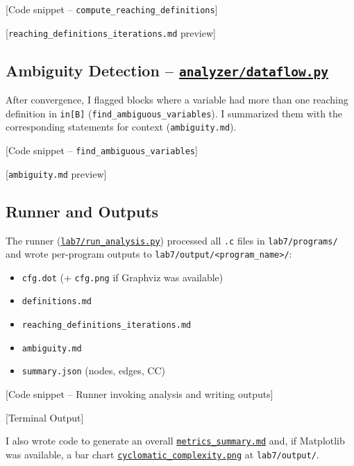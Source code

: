 \documentclass[10pt,a4paper]{report}
\begin{document}
[Code snippet -- \texttt{compute\_reaching\_definitions}]

[\texttt{reaching\_definitions\_iterations.md} preview]

\subsection{Ambiguity Detection -- \href{https://github.com/ShardulJunagade/cs202-stt/tree/main/lab7/analyzer/dataflow.py}{\texttt{analyzer/dataflow.py}}}
After convergence, I flagged blocks where a variable had more than one reaching definition in \texttt{in[B]} (\texttt{find\_ambiguous\_variables}). I summarized them with the corresponding statements for context (\texttt{ambiguity.md}).

[Code snippet -- \texttt{find\_ambiguous\_variables}]

[\texttt{ambiguity.md} preview]

\subsection{Runner and Outputs}
The runner (\href{https://github.com/ShardulJunagade/cs202-stt/tree/main/lab7/run_analysis.py}{\texttt{lab7/run\_analysis.py}}) processed all \texttt{.c} files in \texttt{lab7/programs/} and wrote per-program outputs to \texttt{lab7/output/\textless program\_name\textgreater{}/}:
\begin{itemize}[itemsep=0em, topsep=0pt]
    \item \texttt{cfg.dot} (+ \texttt{cfg.png} if Graphviz was available)
    \item \texttt{definitions.md}
    \item \texttt{reaching\_definitions\_iterations.md}
    \item \texttt{ambiguity.md}
    \item \texttt{summary.json} (nodes, edges, CC)
\end{itemize}

[Code snippet -- Runner invoking analysis and writing outputs]

[Terminal Output]

I also wrote code to generate an overall \href{https://github.com/ShardulJunagade/cs202-stt/tree/main/lab7/output/metrics_summary.md}{\texttt{metrics\_summary.md}} and, if Matplotlib was available, a bar chart \href{https://github.com/ShardulJunagade/cs202-stt/tree/main/lab7/output/cyclomatic_complexity.png}{\texttt{cyclomatic\_complexity.png}} at \texttt{lab7/output/}.
\end{document}
